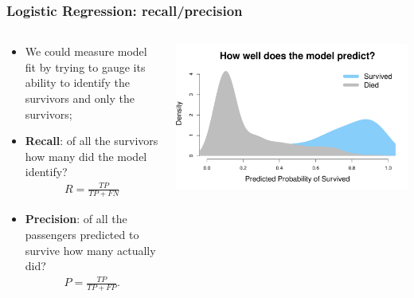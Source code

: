 \documentclass[aspectratio=169]{beamer}
\theoremstyle{principle}
\begin{document}
\begin{frame}
\frametitle{Logistic Regression: recall/precision}

\begin{columns}
\begin{column}{0.5\textwidth}

\begin{itemize}
\item We could measure model fit by trying to gauge its ability to identify the survivors and only the survivors;
\bigskip

\item \textbf{Recall}: of all the survivors how many did the model identify?
\begin{align*}
R = \frac{TP}{TP + FN}
\end{align*}

\item \textbf{Precision}: of all the passengers predicted to survive how many actually did?
\begin{align*}
P = \frac{TP}{TP + FP}.
\end{align*}
\bigskip

\end{itemize}

\end{column}
\begin{column}{0.5\textwidth}

\includegraphics[scale=0.35]{titanic_prediction_dens.pdf}

\end{column}
\end{columns}

\end{frame}
\end{document}
